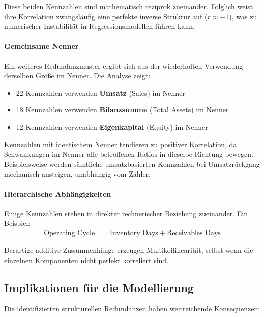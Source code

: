 Diese beiden Kennzahlen sind mathematisch reziprok zueinander. Folglich weist ihre Korrelation zwangsläufig eine perfekte inverse Struktur auf ($r \approx -1$), was zu numerischer Instabilität in Regressionsmodellen führen kann.

\paragraph{Gemeinsame Nenner}
Ein weiteres Redundanzmuster ergibt sich aus der wiederholten Verwendung derselben Größe im Nenner. Die Analyse zeigt:
\begin{itemize}[topsep=0.2\baselineskip]
    \item 22 Kennzahlen verwenden \textbf{Umsatz} (Sales) im Nenner
    \item 18 Kennzahlen verwenden \textbf{Bilanzsumme} (Total Assets) im Nenner
    \item 12 Kennzahlen verwenden \textbf{Eigenkapital} (Equity) im Nenner
\end{itemize}

Kennzahlen mit identischem Nenner tendieren zu positiver Korrelation, da Schwankungen im Nenner alle betroffenen Ratios in dieselbe Richtung bewegen. Beispielsweise werden sämtliche umsatzbasierten Kennzahlen bei Umsatzrückgang mechanisch ansteigen, unabhängig vom Zähler.

\paragraph{Hierarchische Abhängigkeiten}
Einige Kennzahlen stehen in direkter rechnerischer Beziehung zueinander. Ein Beispiel:
\begin{align*}
\text{Operating Cycle} &= \text{Inventory Days} + \text{Receivables Days}
\end{align*}

Derartige additive Zusammenhänge erzeugen Multikollinearität, selbst wenn die einzelnen Komponenten nicht perfekt korreliert sind.

\subsection{Implikationen für die Modellierung}

Die identifizierten strukturellen Redundanzen haben weitreichende Konsequenzen:


